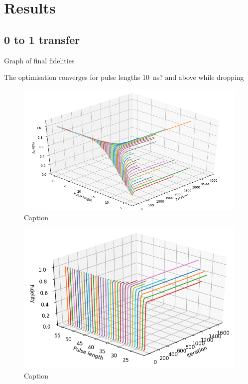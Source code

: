 \documentclass[main.tex]{subfiles}
\begin{document}
\chapter{Results}

\section{0 to 1 transfer}
Graph of final fidelities

The optimisation converges for pulse lengths \SI{10}{\nano\second}? and above while dropping 

\begin{figure}
    \centering
    \includegraphics[width=\linewidth]{figs/3d-optim-ge.png}
    \caption{Caption}
    \label{fig:3d-optim-ge}
\end{figure}

\begin{figure}
    \centering
    \includegraphics[width=0.7\linewidth]{figs/3d-optim-gf.png}
    \caption{Caption}
    \label{fig:3d-optim-gf}
\end{figure}

\end{document}
